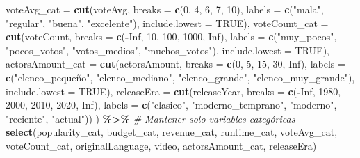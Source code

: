\documentclass[
]{article}
\newenvironment{Shaded}{\begin{snugshade}}{\end{snugshade}}
\newcommand{\AttributeTok}[1]{\textcolor[rgb]{0.13,0.29,0.53}{#1}}
\newcommand{\CommentTok}[1]{\textcolor[rgb]{0.56,0.35,0.01}{\textit{#1}}}
\newcommand{\ConstantTok}[1]{\textcolor[rgb]{0.56,0.35,0.01}{#1}}
\newcommand{\DecValTok}[1]{\textcolor[rgb]{0.00,0.00,0.81}{#1}}
\newcommand{\FunctionTok}[1]{\textcolor[rgb]{0.13,0.29,0.53}{\textbf{#1}}}
\newcommand{\NormalTok}[1]{#1}
\newcommand{\SpecialCharTok}[1]{\textcolor[rgb]{0.81,0.36,0.00}{\textbf{#1}}}
\newcommand{\StringTok}[1]{\textcolor[rgb]{0.31,0.60,0.02}{#1}}
\begin{document}
\begin{Shaded}
\begin{Highlighting}[]
    \AttributeTok{voteAvg\_cat =} \FunctionTok{cut}\NormalTok{(voteAvg,}
                      \AttributeTok{breaks =} \FunctionTok{c}\NormalTok{(}\DecValTok{0}\NormalTok{, }\DecValTok{4}\NormalTok{, }\DecValTok{6}\NormalTok{, }\DecValTok{7}\NormalTok{, }\DecValTok{10}\NormalTok{),}
                      \AttributeTok{labels =} \FunctionTok{c}\NormalTok{(}\StringTok{"mala"}\NormalTok{, }\StringTok{"regular"}\NormalTok{, }\StringTok{"buena"}\NormalTok{, }\StringTok{"excelente"}\NormalTok{),}
                      \AttributeTok{include.lowest =} \ConstantTok{TRUE}\NormalTok{),}
    \AttributeTok{voteCount\_cat =} \FunctionTok{cut}\NormalTok{(voteCount,}
                    \AttributeTok{breaks =} \FunctionTok{c}\NormalTok{(}\SpecialCharTok{{-}}\ConstantTok{Inf}\NormalTok{, }\DecValTok{10}\NormalTok{, }\DecValTok{100}\NormalTok{, }\DecValTok{1000}\NormalTok{, }\ConstantTok{Inf}\NormalTok{),}
                    \AttributeTok{labels =} \FunctionTok{c}\NormalTok{(}\StringTok{"muy\_pocos"}\NormalTok{, }\StringTok{"pocos\_votos"}\NormalTok{, }\StringTok{"votos\_medios"}\NormalTok{, }\StringTok{"muchos\_votos"}\NormalTok{),}
                    \AttributeTok{include.lowest =} \ConstantTok{TRUE}\NormalTok{),}
    \AttributeTok{actorsAmount\_cat =} \FunctionTok{cut}\NormalTok{(actorsAmount,}
                           \AttributeTok{breaks =} \FunctionTok{c}\NormalTok{(}\DecValTok{0}\NormalTok{, }\DecValTok{5}\NormalTok{, }\DecValTok{15}\NormalTok{, }\DecValTok{30}\NormalTok{, }\ConstantTok{Inf}\NormalTok{),}
                           \AttributeTok{labels =} \FunctionTok{c}\NormalTok{(}\StringTok{"elenco\_pequeño"}\NormalTok{, }\StringTok{"elenco\_mediano"}\NormalTok{, }\StringTok{"elenco\_grande"}\NormalTok{, }\StringTok{"elenco\_muy\_grande"}\NormalTok{),}
                           \AttributeTok{include.lowest =} \ConstantTok{TRUE}\NormalTok{),}
    \AttributeTok{releaseEra =} \FunctionTok{cut}\NormalTok{(releaseYear,}
                     \AttributeTok{breaks =} \FunctionTok{c}\NormalTok{(}\SpecialCharTok{{-}}\ConstantTok{Inf}\NormalTok{, }\DecValTok{1980}\NormalTok{, }\DecValTok{2000}\NormalTok{, }\DecValTok{2010}\NormalTok{, }\DecValTok{2020}\NormalTok{, }\ConstantTok{Inf}\NormalTok{),}
                     \AttributeTok{labels =} \FunctionTok{c}\NormalTok{(}\StringTok{"clasico"}\NormalTok{, }\StringTok{"moderno\_temprano"}\NormalTok{, }\StringTok{"moderno"}\NormalTok{, }\StringTok{"reciente"}\NormalTok{, }\StringTok{"actual"}\NormalTok{))}
\NormalTok{  ) }\SpecialCharTok{\%\textgreater{}\%}
  \CommentTok{\# Mantener solo variables categóricas}
  \FunctionTok{select}\NormalTok{(popularity\_cat, budget\_cat, revenue\_cat, runtime\_cat,}
\NormalTok{         voteAvg\_cat, voteCount\_cat, originalLanguage, video,}
\NormalTok{         actorsAmount\_cat, releaseEra)}


\end{Highlighting}
\end{Shaded}
\end{document}

